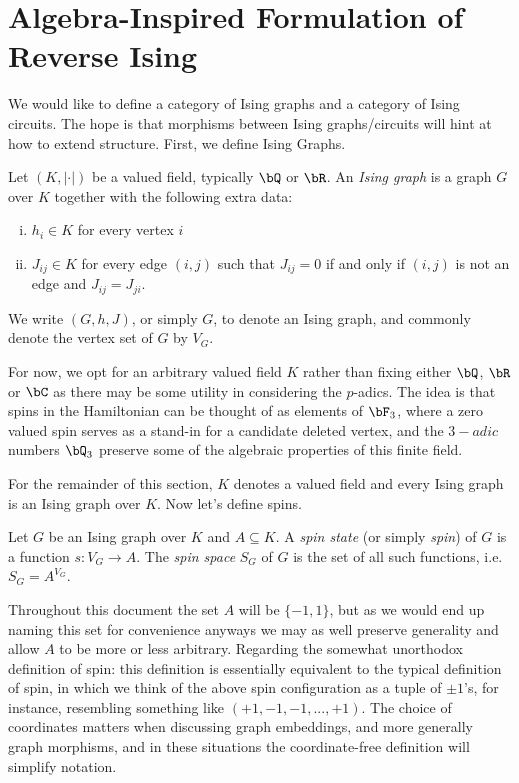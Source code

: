 \section{Algebra-Inspired Formulation of Reverse Ising}
We would like to define a category of Ising graphs and a category of Ising circuits. The hope is that morphisms between Ising graphs/circuits will hint at how to extend structure. First, we define Ising Graphs.
\begin{defn}\label{defn:ising-graph}
	Let $(K,|\cdot|)$ be a valued field, typically $\bQ$ or $\bR$. An \emph{Ising graph} is a graph $G$ over $K$ together with the following extra data:
	\begin{enumerate}[(i)]
		\item $h_i \in K$ for every vertex $i$
		\item $J_{ij} \in K$ for every edge $(i,j)$ such that $J_{ij} = 0$ if and only if  $(i,j)$ is not an edge and $J_{ij} = J_{ji}$.
	\end{enumerate}
	We write $(G,h,J)$, or simply $G$, to denote an Ising graph, and commonly denote the vertex set of $G$ by $V_G$.
\end{defn}
\begin{rmk}\label{rmk:generality-in-ising-graph}
	For now, we opt for an arbitrary valued field $K$ rather than fixing either $\bQ$, $\bR$ or $\bC$ as there may be some utility in considering the $p$-adics. The idea is that spins in the Hamiltonian can be thought of as elements of $\bF_3$, where a zero valued spin serves as a stand-in for a candidate deleted vertex, and the $3-adic$ numbers $\bQ_3$ preserve some of the algebraic properties of this finite field.
\end{rmk}
For the remainder of this section, $K$ denotes a valued field and every Ising graph is an Ising graph over $K$. Now let's define spins.
\begin{defn}\label{defn:spin-space}
	Let $G$ be an Ising graph over $K$ and $A\subseteq K$. A \emph{spin state} (or simply \emph{spin}) of $G$ is a function $s:V_G\to A$. The \emph{spin space} $S_G$ of $G$ is the set of all such functions, i.e. $S_G = A^{V_G}$.
\end{defn}
\begin{rmk}\label{rmk:spin-intuition}
	Throughout this document the set $A$ will be $\{-1,1\}$, but as we would end up naming this set for convenience anyways we may as well preserve generality and allow $A$ to be more or less arbitrary. Regarding the somewhat unorthodox definition of spin: this definition is essentially equivalent to the typical definition of spin, in which we think of the above spin configuration as a tuple of $\pm 1$'s, for instance, resembling something like $(+1,-1,-1,...,+1)$. The choice of coordinates matters when discussing graph embeddings, and more generally graph morphisms, and in these situations the coordinate-free definition will simplify notation.
\end{rmk}

